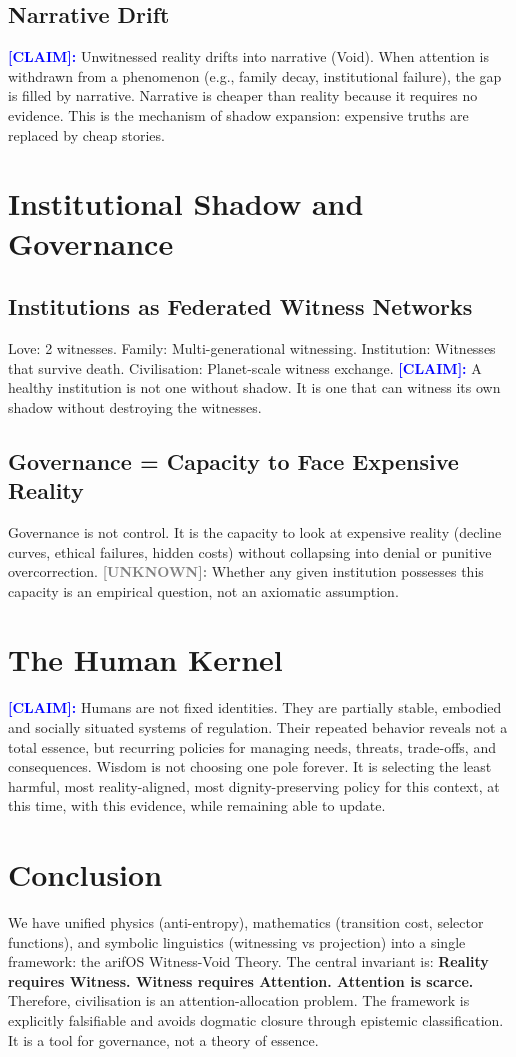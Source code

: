 \documentclass[11pt, a4paper]{article}
\newcommand{\claim}[1]{\noindent\textbf{\textcolor{blue}{[CLAIM]:}} #1}
\newcommand{\unknown}[1]{\noindent\textbf{\textcolor{gray}{[UNKNOWN]:}} #1}
\begin{document}
\subsection{Narrative Drift}
\claim{Unwitnessed reality drifts into narrative (Void).}
When attention is withdrawn from a phenomenon (e.g., family decay, institutional failure), the gap is filled by narrative. Narrative is cheaper than reality because it requires no evidence. This is the mechanism of shadow expansion: expensive truths are replaced by cheap stories.

\section{Institutional Shadow and Governance}
\subsection{Institutions as Federated Witness Networks}
Love: 2 witnesses. Family: Multi-generational witnessing. Institution: Witnesses that survive death. Civilisation: Planet-scale witness exchange.
\claim{A healthy institution is not one without shadow. It is one that can witness its own shadow without destroying the witnesses.}

\subsection{Governance = Capacity to Face Expensive Reality}
Governance is not control. It is the capacity to look at expensive reality (decline curves, ethical failures, hidden costs) without collapsing into denial or punitive overcorrection.
\unknown{Whether any given institution possesses this capacity is an empirical question, not an axiomatic assumption.}

\section{The Human Kernel}
\claim{Humans are not fixed identities. They are partially stable, embodied and socially situated systems of regulation.}
Their repeated behavior reveals not a total essence, but recurring policies for managing needs, threats, trade-offs, and consequences.
Wisdom is not choosing one pole forever. It is selecting the least harmful, most reality-aligned, most dignity-preserving policy for this context, at this time, with this evidence, while remaining able to update.

\section{Conclusion}
We have unified physics (anti-entropy), mathematics (transition cost, selector functions), and symbolic linguistics (witnessing vs projection) into a single framework: the arifOS Witness-Void Theory. The central invariant is: \textbf{Reality requires Witness. Witness requires Attention. Attention is scarce.} Therefore, civilisation is an attention-allocation problem. The framework is explicitly falsifiable and avoids dogmatic closure through epistemic classification. It is a tool for governance, not a theory of essence.
\end{document}
